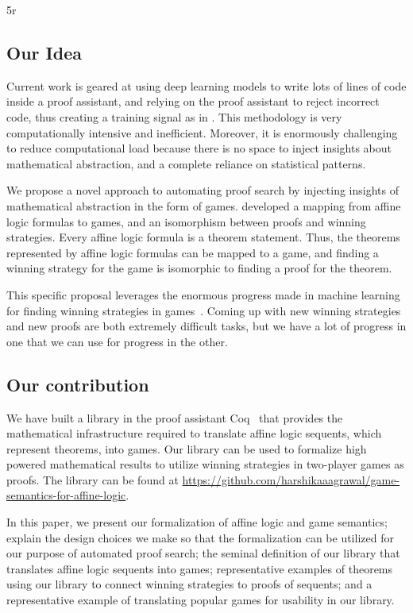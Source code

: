 5r\documentclass{article}
\theoremstyle{definition}
\begin{document}
\subsection{Our Idea}
Current work is geared at using deep learning models to write lots of lines of code inside a proof assistant, and relying on the proof assistant to reject incorrect code, thus creating a training signal as in \textcite{DBLP:journals/corr/LoosISK17, DBLP:journals/corr/abs-1805-07563}. This methodology is very computationally intensive and inefficient. Moreover, it is enormously challenging to reduce computational load because there is no space to inject insights about mathematical abstraction, and a complete reliance on statistical patterns. 

We propose a novel approach to automating proof search by injecting insights of mathematical abstraction in the form of games. \textcite{Blass1992} developed a mapping from affine logic formulas to games, and an isomorphism between proofs and winning strategies. Every affine logic formula is a theorem statement. Thus, the theorems represented by affine logic formulas can be mapped to a game, and finding a winning strategy for the game is isomorphic to finding a proof for the theorem.

This specific proposal leverages the enormous progress made in machine learning for finding winning strategies in games~\cite{AlphaGo,alphastarblog}. Coming up with new winning strategies and new proofs are both extremely difficult tasks, but we have a lot of progress in one that we can use for progress in the other. 

\subsection{Our contribution}

We have built a library in the proof assistant Coq~\cite{coq} that provides the mathematical infrastructure required to translate affine logic sequents, which represent theorems, into games. Our library can be used to formalize high powered mathematical results to utilize winning strategies in two-player games as proofs. The library can be found at \url{https://github.com/harshikaaagrawal/game-semantics-for-affine-logic}.

In this paper, we present our formalization of affine logic and game semantics; explain the design choices we make so that the formalization can be utilized for our purpose of automated proof search; the seminal definition of our library that translates affine logic sequents into games; representative examples of theorems using our library to connect winning strategies to proofs of sequents; and a representative example of translating popular games for usability in our library.
\end{document}
